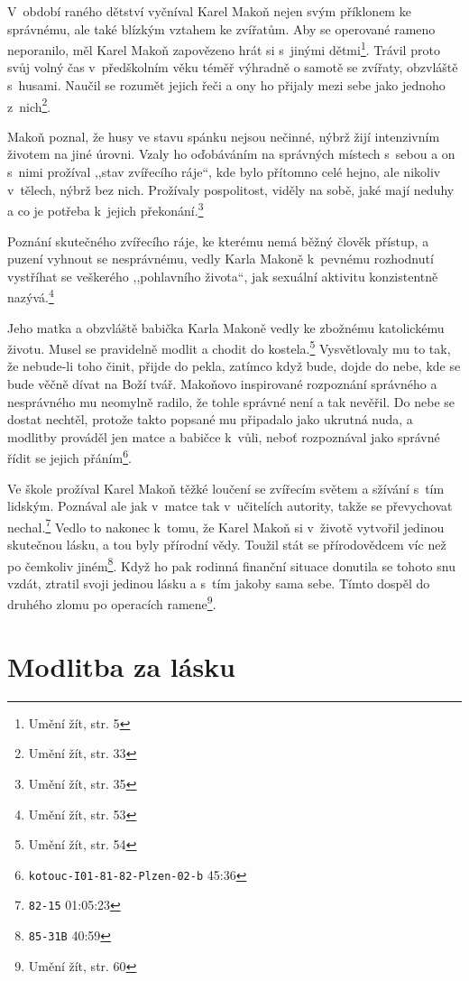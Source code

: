 V~období raného dětství vyčníval Karel Makoň nejen svým příklonem ke správnému, ale
také blízkým vztahem ke zvířatům. Aby se operované rameno neporanilo, měl
Karel Makoň zapovězeno hrát si s~jinými dětmi\footnote{Umění žít, str. 5}. Trávil proto svůj volný čas
v~předškolním věku téměř výhradně o samotě se zvířaty, obzvláště s~husami.
Naučil se rozumět jejich řeči a ony ho přijaly mezi sebe jako jednoho z~nich\footnote{Umění žít, str. 33}.

Makoň poznal, že husy ve stavu spánku nejsou nečinné, nýbrž žijí intenzivním
životem na jiné úrovni. Vzaly ho oďobáváním na správných místech s~sebou a on
s~nimi prožíval ,,stav zvířecího ráje``, kde bylo přítomno celé hejno, ale
nikoliv v~tělech, nýbrž bez nich. Prožívaly pospolitost, viděly na sobě, jaké
mají neduhy a co je potřeba k~jejich překonání.\footnote{Umění žít, str. 35}

Poznání skutečného zvířecího ráje, ke kterému nemá běžný člověk přístup, a
puzení vyhnout se nesprávnému, vedly Karla Makoně k~pevnému rozhodnutí vystříhat
se veškerého ,,pohlavního života``, jak sexuální aktivitu konzistentně
nazývá.\footnote{Umění žít, str. 53}

Jeho matka a obzvláště babička Karla Makoně vedly ke zbožnému katolickému
životu. Musel se pravidelně modlit a chodit do kostela.\footnote{Umění žít, str.
54} Vysvětlovaly mu to tak,
že nebude-li toho činit, přijde do pekla, zatímco když bude, dojde do nebe, kde
se bude věčně dívat na Boží tvář. Makoňovo inspirované rozpoznání správného a
nesprávného mu neomylně radilo, že tohle správné není a tak nevěřil. Do nebe se
dostat nechtěl, protože takto popsané mu připadalo jako ukrutná nuda, a modlitby
prováděl jen matce a babičce k~vůli, neboť rozpoznával jako správné řídit se
jejich přáním\footnote{\texttt{kotouc-I01-81-82-Plzen-02-b} 45:36}.

Ve škole prožíval Karel Makoň těžké loučení se zvířecím světem a sžívání s~tím
lidským. Poznával ale jak v~matce tak v~učitelích autority, takže se převychovat
nechal.\footnote{\texttt{82-15} 01:05:23} Vedlo to nakonec k~tomu, že Karel Makoň si v~životě vytvořil jedinou
skutečnou lásku, a tou byly přírodní vědy. Toužil stát se přírodovědcem víc než
po čemkoliv jiném\footnote{\texttt{85-31B} 40:59}. Když ho pak rodinná finanční situace donutila se tohoto snu
vzdát, ztratil svoji jedinou lásku a s~tím jakoby sama sebe.
Tímto dospěl do druhého zlomu po operacích ramene\footnote{Umění žít, str. 60}.

\section{Modlitba za lásku}

